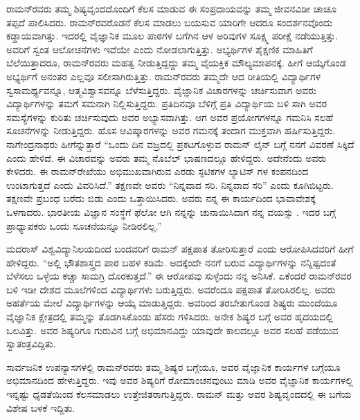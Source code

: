 ರಾಮನ್‍ರವರು ತಮ್ಮ ಶಿಷ್ಯವೃಂದದೊಂದಿಗೆ ಕೆಲಸ ಮಾಡುವ ಈ ಸಂಪ್ರದಾಯವನ್ನು ತಮ್ಮ ಜೀವನವಿಡೀ ಚಾಚೂ ತಪ್ಪದೆ ಪಾಲಿಸಿದರು. ರಾಮನ್‍ರವರೊಡನೆ ಕೆಲಸ ಮಾಡಲು ಬಯಸುವ ಯಾರಿಗೇ ಆದರೂ ಸಂದರ್ಶನವೊಂದು ಕಡ್ಡಾಯವಾಗಿತ್ತು. ಇದರಲ್ಲಿ ವೈಜ್ಞಾನಿಕ ಮೂಲ ಪಾಠಗಳ ಬಗೆಗಿನ ಆಳ ಅರಿವುಗಳ ಸೂಕ್ಷ್ಮ ಪರೀಕ್ಷೆ ನಡೆಯುತ್ತಿತ್ತು. ಅವರಿಗೆ ಸ್ವಂತ ಆಲೋಚನೆಗಳು ಇವೆಯೇ ಎಂದು ನೋಡಲಾಗುತ್ತಿತ್ತು. ಅಭ್ಯರ್ಥಿಗಳ ಶೈಕ್ಷಣಿಕ ಮಾಹಿತಿಗೆ ಬೆಲೆಯಿತ್ತಾದರೂ, ರಾಮನ್‍ರವರು ಮಹತ್ವ ನೀಡುತ್ತಿದ್ದದ್ದು ತಮ್ಮ ವೈಯಕ್ತಿಕ ಮೌಲ್ಯಮಾಪನಕ್ಕೆ. ಹೀಗೆ ಆಯ್ಕೆಗೊಂಡ ಅಭ್ಯರ್ಥಿಗೆ ಅನಂತರ ಎಲ್ಲವೂ ಸಲೀಸಾಗಿರುತ್ತಿತ್ತು. ರಾಮನ್‍ರವರು ತಮ್ಮದೇ ಆದ ರೀತಿಯಲ್ಲಿ ವಿದ್ಯಾರ್ಥಿಗಳ ಸ್ವಸಾಮರ್ಥ್ಯವನ್ನೂ, ಆತ್ಮವಿಶ್ವಾಸವನ್ನೂ ಬೆಳೆಸುತ್ತಿದ್ದರು. ವೈಜ್ಞಾನಿಕ ವಿಚಾರಗಳನ್ನು ಚರ್ಚಿಸುವಾಗ ಅವರು ವಿದ್ಯಾರ್ಥಿಗಳನ್ನು ತಮಗೆ ಸಮನಾಗಿ ನಿಲ್ಲಿಸುತ್ತಿದ್ದರು. ಪ್ರತಿದಿನವೂ ಬೆಳಿಗ್ಗೆ ಪ್ರತಿ ವಿದ್ಯಾರ್ಥಿಯ ಬಳಿ ಸಾಗಿ ಅವರ ಸಮಸ್ಯೆಗಳನ್ನು ಕುರಿತು ಚರ್ಚಿಸುವುದು ಅವರ ಅಭ್ಯಾಸವಾಗಿತ್ತು. ಆಗ ಅವರ ಪ್ರಯೋಗಗಳನ್ನೂ ಗಮನಿಸಿ ಸಲಹೆ ಸೂಚನೆಗಳನ್ನು ನೀಡುತ್ತಿದ್ದರು. ಹೊಸ ಆವಿಷ್ಕಾರಗಳನ್ನು ಅವರ ಗಮನಕ್ಕೆ ತಂದಾಗ ಮುಕ್ತವಾಗಿ ಹರ್ಷಿಸುತ್ತಿದ್ದರು. ನಾಗೇಂದ್ರನಾಥರು ಹೀಗೆನ್ನುತ್ತಾರೆ “ಒಂದು ದಿನ ವಜ್ರದಲ್ಲಿ ಪ್ರಕಟಗೊಳ್ಳುವ ರಾಮನ್ ಲೈನ್ ಬಗ್ಗೆ ನನಗೆ ವಿವರಣೆ ಸಿಕ್ಕಿದೆ ಎಂದು ಹೇಳಿದೆ. ಈ ವಿಚಾರವನ್ನು ಅವರು ತಮ್ಮ ನೊಬೆಲ್ ಭಾಷಣದಲ್ಲೂ ಹೇಳಿದ್ದರು. ಅದೇನೆಂದು ಅವರು ಕೇಳಿದರು. ಈ ರಾಮನ್‌ರೇಖೆಯು ಅಭಿಮುಖವಾಗಿರುವ ಎರಡು ಸ್ಫಟಿಕಗಳ ಲ್ಯಾಟಿಸ್ ಗಳ ಕಂಪನದಿಂದ ಉಂಟಾಗುತ್ತದೆ ಎಂದು ವಿವರಿಸಿದೆ.” ತಕ್ಷಣವೇ ಅವರು “ನಿನ್ನವಾದ ಸರಿ. ನಿನ್ನವಾದ ಸರಿ” ಎಂದು ಕೂಗಿಬಿಟ್ಟರು. ತಕ್ಷಣವೇ ಪ್ರಬಂಧ ಬರೆದು ಬಿಡು ಎಂದು ಒತ್ತಾಯಿಸಿದರು. ಅವರು ನನ್ನ ಈ ಕಾರ್ಯದಿಂದ ಭಾವಾವೇಶಕ್ಕೆ ಒಳಗಾದರು. ಭಾರತೀಯ ವಿಜ್ಞಾನ ಸಂಸ್ಥೆಗೆ ಫೆಲೋ ಆಗಿ ನನ್ನನ್ನು ಚುನಾಯಿಸಿದಾಗ ನನ್ನ ವಯಸ್ಸು . ಇದರ ಬಗ್ಗೆ ಪ್ರಾಧ್ಯಾಪಕರು ಒಂದು ಸೂಚನೆಯನ್ನೂ ನೀಡಿರಲಿಲ್ಲ.”

ಮದರಾಸ್ ವಿಶ್ವವಿದ್ಯಾನಿಲಯದಿಂದ ಬಂದವರಿಗೆ ರಾಮನ್ ಪಕ್ಷಪಾತ ತೋರಿಸುತ್ತಾರೆ ಎಂದು ಆರೋಪಿಸಿದವರಿಗೆ ಹೀಗೆ ಹೇಳಿದ್ದರು. “ಅಲ್ಲಿ ಭೌತಶಾಸ್ತ್ರದ ಪಾಠ ಬಹಳ ಕಡಿಮೆ. ಅದಕ್ಕೆಂದೇ ನನಗೆ ಬರುವ ವಿದ್ಯಾರ್ಥಿಗಳನ್ನು ನನ್ನಿಷ್ಟದಂತೆ ಬೆಳೆಸಲು ಒಳ್ಳೆಯ ಕಚ್ಚಾ ಸಾಮಗ್ರಿ ದೊರಕುತ್ತದೆ.” ಈ ಆರೋಪವು ಸುಳ್ಳೆಂದು ನನ್ನ ಅನಿಸಿಕೆ. ಏಕೆಂದರೆ ರಾಮನ್‍ರವರ ಬಳಿ ಇಡೀ ದೇಶದ ಮೂಲೆಗಳಿಂದ ವಿದ್ಯಾರ್ಥಿಗಳು ಬರುತ್ತಿದ್ದರು. ಅವರೆಂದೂ ಪಕ್ಷಪಾತ ತೋರಿಸಿರಲಿಲ್ಲ. ಅವರು ಅಹರ್ತೆಯ ಮೇಲೆ ವಿದ್ಯಾರ್ಥಿಗಳನ್ನು ಆಯ್ಕೆ ಮಾಡುತ್ತಿದ್ದರು. ಅವರಿಂದ ತರಬೇತುಗೊಂಡ ಶಿಷ್ಯರು ಮುಂದೆಯೂ ವೈಜ್ಞಾನಿಕ ಕ್ಷೇತ್ರದಲ್ಲಿ ತಮ್ಮನ್ನು ತೊಡಗಿಸಿಕೊಂಡು ಹೆಸರು ಗಳಿಸಿದರು. ಅನೇಕ ಶಿಷ್ಯರ ಬಗ್ಗೆ ಅವರ ಹೃದಯದಲ್ಲಿ ಒಲವಿತ್ತು. ಅವರ ಶಿಷ್ಯರಿಗೂ ಗುರುವಿನ ಬಗ್ಗೆ ಅಭಿಮಾನವಿದ್ದು ಯಾವುದೇ ಕಾಲದಲ್ಲೂ ಅವರ ಸಲಹೆ ಪಡೆಯುವ ಸ್ವಾತಂತ್ರವಿದ್ದಿತು.

ಸಾರ್ವಜನಿಕ ಉಪನ್ಯಾಸಗಳಲ್ಲಿ ರಾಮನ್‍ರವರು ತಮ್ಮ ಶಿಷ್ಯರ ಬಗ್ಗೆಯೂ, ಅವರ ವೈಜ್ಞಾನಿಕ ಕಾರ್ಯಗಳ ಬಗ್ಗೆಯೂ ಅಭಿಮಾನದಿಂದ ಹೇಳುತ್ತಿದ್ದರು. ಇವು ಅವರ ಶಿಷ್ಯರಿಗೆ ರೋಮಾಂಚನ\-ವುಂಟು ಮಾಡಿ ಅವರ ವೈಜ್ಞಾನಿಕ ಕಾರ್ಯಗಳಲ್ಲಿ ಇನ್ನಷ್ಟು ಧೃಡತೆಯಿಂದ ಕೆಲಸಮಾಡಲು ಉತ್ತೇಜಿತ\-ರಾಗುತ್ತಿದ್ದರು. ರಾಮನ್ ಮತ್ತು ಅವರ ಶಿಷ್ಯವೃಂದದಲ್ಲಿ ಈ ಬಗೆಯ ವಿಶೇಷ ಬಳಕೆ ಇದ್ದಿತು.



